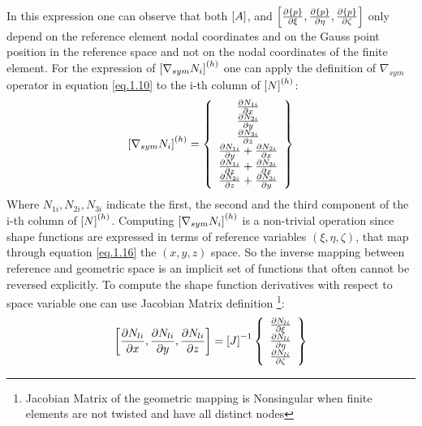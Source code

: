 In this expression one can observe that both $\left[{A}\right]$, and $\left[{\frac{\partial \left\lbrace{p}\right \rbrace}{\partial \xi},\frac{\partial \left\lbrace{p}\right \rbrace}{\partial \eta},\frac{\partial \left\lbrace{p}\right \rbrace}{\partial \zeta}}\right] $ only depend on the reference element nodal coordinates and on the Gauss point position in the reference space and not on the nodal coordinates of the finite element.
For the expression of $\left[{\nabla_{sym}N_i}\right]^{(h)}$ one can apply the definition of $\nabla_{sym}$ operator in equation \ref{eq.1.10} to the i-th column of $\left[{N}\right]^{(h)}$:
\begin{equation}
	\left[{\nabla_{sym}N_i}\right]^{(h)}=\left\lbrace{\begin{array}{c}
		\frac{\partial N_{1i}}{\partial x}\\\frac{\partial N_{2i}}{\partial y}\\\frac{\partial N_{3i}}{\partial z}\\
		\frac{\partial N_{1i}}{\partial y}+\frac{\partial N_{2i}}{\partial x}\\\frac{\partial N_{1i}}{\partial z}+\frac{\partial N_{3i}}{\partial x}\\\frac{\partial N_{2i}}{\partial z}+\frac{\partial N_{3i}}{\partial y}
		\end{array}}\right \rbrace
\end{equation}
Where $N_{1i},N_{2i},N_{3i}$ indicate the first, the second and the third component of the i-th column of  $\left[{N}\right]^{(h)}$.
Computing $\left[{\nabla_{sym}N_i}\right]^{(h)}$ is a non-trivial operation since shape functions are expressed in terms of reference variables $(\xi,\eta,\zeta)$, that map through equation \ref{eq.1.16} the $(x,y,z)$ space. So the inverse mapping between reference and geometric space is an implicit set of functions that often cannot be reversed explicitly. To compute the shape function derivatives with respect to space variable one can use Jacobian Matrix definition \footnote{Jacobian Matrix of the geometric mapping is Nonsingular when finite elements are not twisted and have all distinct nodes}:
\begin{equation}
\left[{\frac{\partial N_{li}}{\partial x},\frac{\partial N_{li}}{\partial y},\frac{\partial N_{li}}{\partial z}}\right]= 
\left[{J}\right]^{-1}\left\lbrace{\begin{array}{c}
	\frac{\partial N_{li}}{\partial \xi}\\\frac{\partial N_{li}}{\partial \eta}\\\frac{\partial N_{li}}{\partial \zeta}\end{array}}\right \rbrace 
\end{equation}
